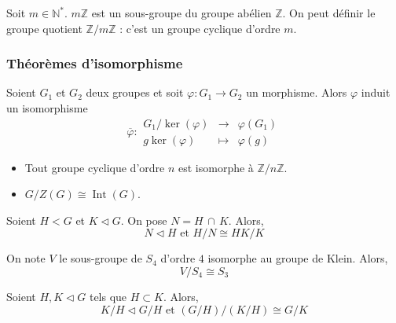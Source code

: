   \begin{example}
    Soit $m \in \mathbb{N}^*$. $m \mathbb{Z}$ est un sous-groupe du groupe abélien $\mathbb{Z}$. On peut définir le groupe quotient $\mathbb{Z}/m\mathbb{Z}$ : c'est un groupe cyclique d'ordre $m$.
  \end{example}

  \subsubsection{Théorèmes d'isomorphisme}


  \begin{theorem}
    Soient $G_1$ et $G_2$ deux groupes et soit $\varphi : G_1 \rightarrow G_2$ un morphisme. Alors $\varphi$ induit un isomorphisme
    \[
      \overline{\varphi} :
      \begin{array}{ccc}
        G_1 / \ker(\varphi) &\rightarrow& \varphi(G_1) \\
        g\ker(\varphi) &\mapsto& \varphi(g)
      \end{array}
    \]
  \end{theorem}

  \begin{example}
    \begin{itemize}
      \item Tout groupe cyclique d'ordre $n$ est isomorphe à $\mathbb{Z}/n\mathbb{Z}$.
      \item $G/Z(G) \cong \operatorname{Int}(G)$.
    \end{itemize}
  \end{example}


  \begin{theorem}
    Soient $H < G$ et $K \lhd G$. On pose $N = H \, \cap \, K$. Alors,
    \[ N \lhd H \text{ et } H/N \cong HK/K \]
  \end{theorem}

  \begin{example}
    On note $V$ le sous-groupe de $S_4$ d'ordre $4$ isomorphe au groupe de Klein. Alors,
    \[ V/S_4 \cong S_3 \]
  \end{example}


  \begin{theorem}
    Soient $H, K \lhd G$ tels que $H \subset K$. Alors,
    \[ K/H \lhd G/H \text{ et } (G/H)/(K/H) \cong G/K \]
  \end{theorem}

